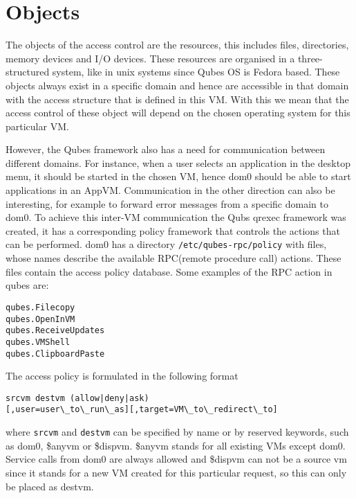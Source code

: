\documentclass[runningheads,a4paper]{article}
\begin{document}
\section{Objects}

The objects of the access control are the resources, this includes
files, directories, memory devices and I/O devices. These resources
are organised in a three-structured system, like in unix systems since Qubes OS is Fedora based.
These
objects always exist in a specific domain and hence are accessible in
that domain with the access structure that is defined in this VM. With
this we mean that the access control of these object will depend on
the chosen operating system for this particular VM. 

However, the Qubes framework also has a need for communication between
different domains. For instance, when a user selects an application in
the desktop menu, it should be started in the chosen VM, hence dom0
should be able to start applications in an AppVM. Communication in the
other direction can also be interesting, for example to forward error
messages from a specific domain to dom0. To achieve this inter-VM
communication the Qubs qrexec framework was created, it has a
corresponding policy framework that controls the actions that can be
performed. dom0 has a directory \texttt{/etc/qubes-rpc/policy} with
files, whose names describe the available RPC(remote procedure call)
actions. These files contain the access policy database. Some examples
of the RPC action in qubes are:
\begin{verbatim}
qubes.Filecopy
qubes.OpenInVM
qubes.ReceiveUpdates
qubes.VMShell
qubes.ClipboardPaste
\end{verbatim} 
The access policy is formulated in the following format
\begin{verbatim}
srcvm destvm (allow|deny|ask)
[,user=user\_to\_run\_as][,target=VM\_to\_redirect\_to]
\end{verbatim}
where \texttt{srcvm} and \texttt{destvm} can be specified by name or
by reserved keywords, such as dom0, \$anyvm or \$dispvm. \$anyvm
stands for all existing VMs except dom0. Service calls
from dom0 are always allowed and \$dispvm can not be a source vm since
it stands for a new VM created for this particular request, so this
can only be placed as destvm.
\end{document}
